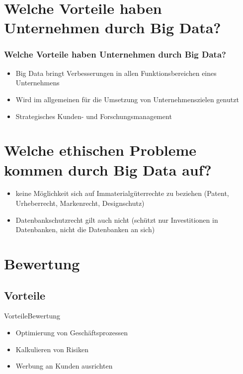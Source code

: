 \documentclass[10pt,a4paper]{beamer}
\begin{document}
\section{Welche Vorteile haben Unternehmen durch Big Data?}
\begin{frame}
\frametitle{Welche Vorteile haben Unternehmen durch Big Data?}
\begin{itemize}
	\item Big Data bringt Verbesserungen in allen Funktionsbereichen eines Unternehmens \pause
	\item Wird im allgemeinen für die Umsetzung von Unternehmenszielen genutzt \pause
	\item Strategisches Kunden- und Forschungsmanagement
\end{itemize}
\end{frame}

\section{Welche ethischen Probleme kommen durch Big Data auf?}
\begin{frame}
\begin{itemize}
  \frametitle{Welche ethischen Probleme kommen durch Big Data auf?}		  
\frametitle{Welche ethischen Probleme kommen durch Big Data auf?}
\item keine Möglichkeit sich auf Immaterialgüterrechte zu beziehen (Patent, Urheberrecht, Markenrecht, Designschutz)\pause
\item Datenbankschutzrecht gilt auch nicht (schützt nur Investitionen in Datenbanken, nicht die Datenbanken an sich)
\end{itemize}
\end{frame}

\section{Bewertung}
\subsection{Vorteile}
\begin{frame}{Vorteile}{Bewertung}
\begin{itemize}
\item Optimierung von Geschäftsprozessen \pause
\item Kalkulieren von Risiken \pause
\item Werbung an Kunden ausrichten
\end{itemize}
\end{frame}
\end{document}
